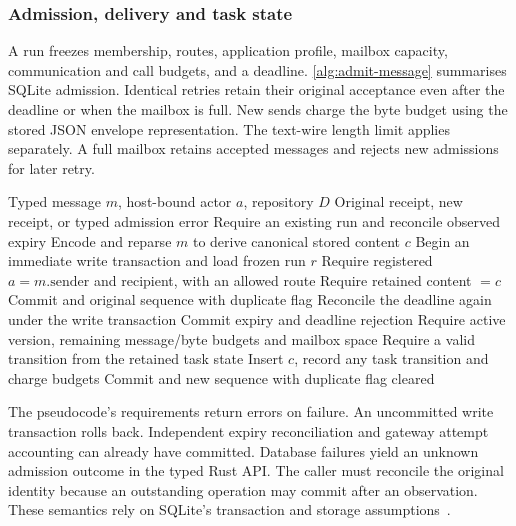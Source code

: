 \documentclass[preprint,12pt,a4paper]{elsarticle}
\begin{document}
\subsubsection{Admission, delivery and task state}
A run freezes membership, routes, application profile, mailbox capacity, communication and call budgets, and a deadline. \autoref{alg:admit-message} summarises SQLite admission. Identical retries retain their original acceptance even after the deadline or when the mailbox is full. New sends charge the byte budget using the stored JSON envelope representation. The text-wire length limit applies separately. A full mailbox retains accepted messages and rejects new admissions for later retry.

\begin{algorithm}[htbp]
\caption{Admit a message into the SQLite repository}\label{alg:admit-message}
\begin{algorithmic}[1]
\Require Typed message $m$, host-bound actor $a$, repository $D$
\Ensure Original receipt, new receipt, or typed admission error
\State Require an existing run and reconcile observed expiry
\State Encode and reparse $m$ to derive canonical stored content $c$
\State Begin an immediate write transaction and load frozen run $r$
\State Require registered $a=m.\mathrm{sender}$ and recipient, with an allowed route
  \State Require retained content $=c$
  \State Commit and \Return original sequence with duplicate flag
\EndIf
\State Reconcile the deadline again under the write transaction
  \State Commit expiry and \Return deadline rejection
\EndIf
\State Require active version, remaining message/byte budgets and mailbox space
  \State Require a valid transition from the retained task state
\EndIf
\State Insert $c$, record any task transition and charge budgets
\State Commit and \Return new sequence with duplicate flag cleared
\end{algorithmic}
\end{algorithm}

The pseudocode's requirements return errors on failure. An uncommitted write transaction rolls back. Independent expiry reconciliation and gateway attempt accounting can already have committed. Database failures yield an unknown admission outcome in the typed Rust API. The caller must reconcile the original identity because an outstanding operation may commit after an observation. These semantics rely on SQLite's transaction and storage assumptions~\citep{sqliteAtomic,sqliteWal}.
\end{document}
